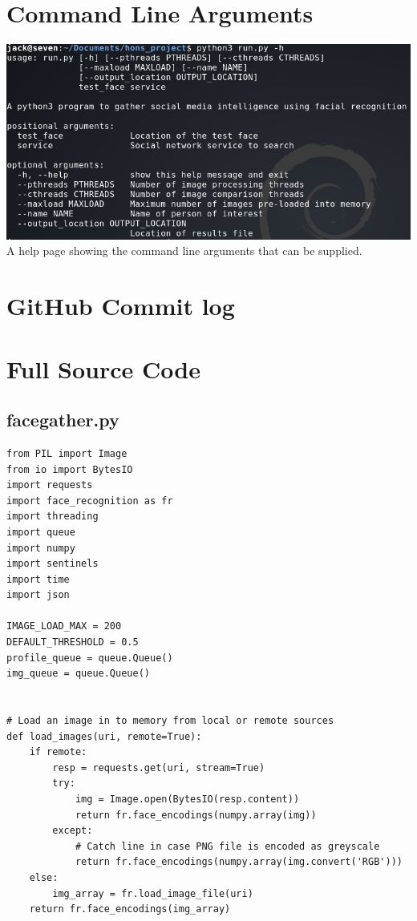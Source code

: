 \documentclass[12pt]{article}
\begin{document}
\begin{appendices}
\section{Command Line Arguments}
\label{appendix:commandlineargs}
\includegraphics[width=\linewidth]{res/facegather_cmd_line_args.png}
A help page showing the command line arguments that can be supplied.

\section{GitHub Commit log}

\section{Full Source Code}
\subsection{facegather.py}
\begin{lstlisting}
from PIL import Image
from io import BytesIO
import requests
import face_recognition as fr
import threading
import queue
import numpy
import sentinels
import time
import json

IMAGE_LOAD_MAX = 200
DEFAULT_THRESHOLD = 0.5
profile_queue = queue.Queue()
img_queue = queue.Queue()


# Load an image in to memory from local or remote sources
def load_images(uri, remote=True):
    if remote:
        resp = requests.get(uri, stream=True)
        try:
            img = Image.open(BytesIO(resp.content))
            return fr.face_encodings(numpy.array(img))
        except:
            # Catch line in case PNG file is encoded as greyscale
            return fr.face_encodings(numpy.array(img.convert('RGB')))
    else:
        img_array = fr.load_image_file(uri)
    return fr.face_encodings(img_array)



\end{lstlisting}
\end{appendices}
\end{document}
